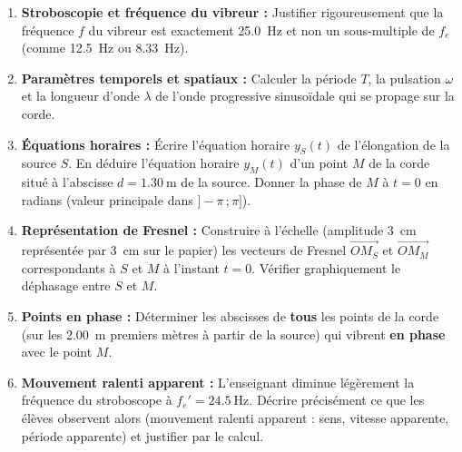 \documentclass[11pt]{article}
\newcounter{popsec}
\newcounter{popsub}
\newcommand{\courssub}[1]{%
  \stepcounter{popsub}%
  \par\vspace{9pt}\noindent{\popxbold\fontsize{11.5}{13}\selectfont\color{popink}{\color{poporange}\thepopsec.\thepopsub}\hspace{6pt}#1}\par\nopagebreak\vspace{4pt}
}
\begin{document}
\courssub{Consignes}
\begin{enumerate}
    \item \textbf{Stroboscopie et fréquence du vibreur :} Justifier rigoureusement que la fréquence $f$ du vibreur est exactement \SI{25,0}{\hertz} et non un sous-multiple de $f_e$ (comme \SI{12,5}{\hertz} ou \SI{8,33}{\hertz}).
    \item \textbf{Paramètres temporels et spatiaux :} Calculer la période $T$, la pulsation $\omega$ et la longueur d'onde $\lambda$ de l'onde progressive sinusoïdale qui se propage sur la corde.
    \item \textbf{Équations horaires :} Écrire l'équation horaire $y_S(t)$ de l'élongation de la source $S$. En déduire l'équation horaire $y_M(t)$ d'un point $M$ de la corde situé à l'abscisse $d = \SI{1,30}{\meter}$ de la source. Donner la phase de $M$ à $t=0$ en radians (valeur principale dans $]-\pi\,;\pi]$).
    \item \textbf{Représentation de Fresnel :} Construire à l'échelle (amplitude \SI{3}{\centi\meter} représentée par \SI{3}{\centi\meter} sur le papier) les vecteurs de Fresnel $\overrightarrow{OM_S}$ et $\overrightarrow{OM_M}$ correspondants à $S$ et $M$ à l'instant $t=0$. Vérifier graphiquement le déphasage entre $S$ et $M$.
    \item \textbf{Points en phase :} Déterminer les abscisses de \textbf{tous} les points de la corde (sur les \SI{2,00}{\meter} premiers mètres à partir de la source) qui vibrent \textbf{en phase} avec le point $M$.
    \item \textbf{Mouvement ralenti apparent :} L'enseignant diminue légèrement la fréquence du stroboscope à $f_e' = \SI{24,5}{\hertz}$. Décrire précisément ce que les élèves observent alors (mouvement ralenti apparent : sens, vitesse apparente, période apparente) et justifier par le calcul.
\end{enumerate}
\end{document}
